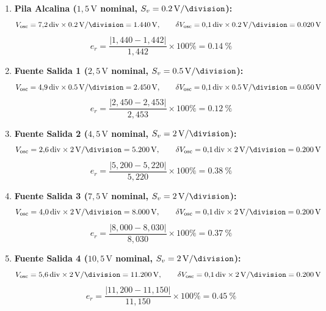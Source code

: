 \begin{enumerate}
    \item \textbf{Pila Alcalina ($1{,}5\,\unit{\volt}$ nominal, $S_v = \qty{0,2}{\volt\per\division}$):}
    \begin{equation}
        V_{\text{osc}} = 7{,}2\,\text{div} \times \qty{0,2}{\volt\per\division} = \qty{1,440}{\volt}, \qquad \delta V_{\text{osc}} = 0{,}1\,\text{div} \times \qty{0,2}{\volt\per\division} = \qty{0,020}{\volt}
    \end{equation}
    \[
        e_r = \frac{|1{,}440 - 1{,}442|}{1{,}442} \times 100\% = \qty{0,14}{\percent}
    \]

    \item \textbf{Fuente Salida 1 ($2{,}5\,\unit{\volt}$ nominal, $S_v = \qty{0,5}{\volt\per\division}$):}
    \begin{equation}
        V_{\text{osc}} = 4{,}9\,\text{div} \times \qty{0,5}{\volt\per\division} = \qty{2,450}{\volt}, \qquad \delta V_{\text{osc}} = 0{,}1\,\text{div} \times \qty{0,5}{\volt\per\division} = \qty{0,050}{\volt}
    \end{equation}
    \[
        e_r = \frac{|2{,}450 - 2{,}453|}{2{,}453} \times 100\% = \qty{0,12}{\percent}
    \]

    \item \textbf{Fuente Salida 2 ($4{,}5\,\unit{\volt}$ nominal, $S_v = \qty{2}{\volt\per\division}$):}
    \begin{equation}
        V_{\text{osc}} = 2{,}6\,\text{div} \times \qty{2}{\volt\per\division} = \qty{5,200}{\volt}, \qquad \delta V_{\text{osc}} = 0{,}1\,\text{div} \times \qty{2}{\volt\per\division} = \qty{0,200}{\volt}
    \end{equation}
    \[
        e_r = \frac{|5{,}200 - 5{,}220|}{5{,}220} \times 100\% = \qty{0,38}{\percent}
    \]

    \item \textbf{Fuente Salida 3 ($7{,}5\,\unit{\volt}$ nominal, $S_v = \qty{2}{\volt\per\division}$):}
    \begin{equation}
        V_{\text{osc}} = 4{,}0\,\text{div} \times \qty{2}{\volt\per\division} = \qty{8,000}{\volt}, \qquad \delta V_{\text{osc}} = 0{,}1\,\text{div} \times \qty{2}{\volt\per\division} = \qty{0,200}{\volt}
    \end{equation}
    \[
        e_r = \frac{|8{,}000 - 8{,}030|}{8{,}030} \times 100\% = \qty{0,37}{\percent}
    \]

    \item \textbf{Fuente Salida 4 ($10{,}5\,\unit{\volt}$ nominal, $S_v = \qty{2}{\volt\per\division}$):}
    \begin{equation}
        V_{\text{osc}} = 5{,}6\,\text{div} \times \qty{2}{\volt\per\division} = \qty{11,200}{\volt}, \qquad \delta V_{\text{osc}} = 0{,}1\,\text{div} \times \qty{2}{\volt\per\division} = \qty{0,200}{\volt}
    \end{equation}
    \[
        e_r = \frac{|11{,}200 - 11{,}150|}{11{,}150} \times 100\% = \qty{0,45}{\percent}
    \]
\end{enumerate}

